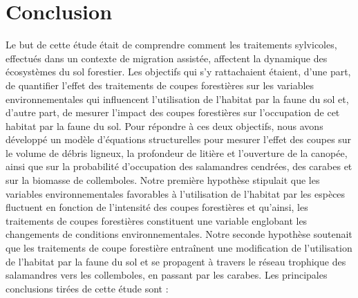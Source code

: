 \chapter*{Conclusion}           %
\label{chap-conclusion}         %


Le but de cette étude était de comprendre comment les traitements sylvicoles, effectués dans un contexte de migration assistée, affectent la dynamique des écosystèmes du sol forestier.
Les objectifs qui s’y rattachaient étaient, d'une part, de quantifier l'effet des traitements de coupes forestières sur les variables environnementales qui influencent 
l'utilisation de l'habitat par la faune du sol et, d'autre part, de mesurer l'impact des coupes forestières sur l'occupation de cet habitat par la faune du sol.
Pour répondre à ces deux objectifs, nous avons développé un modèle d'équations structurelles pour mesurer l'effet des coupes sur le volume de débris ligneux, 
la profondeur de litière et l'ouverture de la canopée, ainsi que sur la probabilité d'occupation des salamandres cendrées, des carabes et sur la biomasse de collemboles.
Notre première hypothèse stipulait que les variables environnementales favorables à l'utilisation de l'habitat par les espèces fluctuent 
en fonction de l'intensité des coupes forestières et qu'ainsi, les traitements de coupes forestières constituent une variable englobant les changements de conditions environnementales. 
Notre seconde hypothèse soutenait que les traitements de coupe forestière entraînent une modification de l'utilisation de l'habitat par la faune du sol et se propagent à travers 
le réseau trophique des salamandres vers les collemboles, en passant par les carabes. 
Les principales conclusions tirées de cette étude sont :


